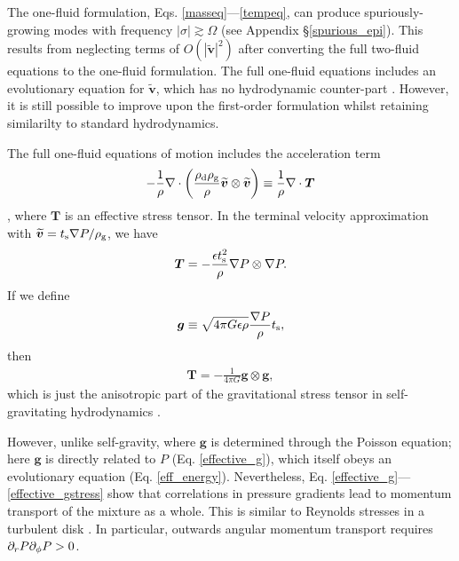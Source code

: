 The one-fluid formulation, 
Eqs. \ref{masseq}---\ref{tempeq}, can 
produce spuriously-growing modes with frequency $|\sigma|\gtrsim
\Omega$ (see Appendix \S\ref{spurious_epi}). This 
results from neglecting terms of $O(|\widetilde{\bm{v}}|^2)$ after converting
the full two-fluid equations to the one-fluid formulation. The full
one-fluid equations 
 includes an evolutionary equation for $\widetilde{\bm{v}}$, which has no
 hydrodynamic counter-part \citep{laibe14}. However, it is
 still possible to improve upon 
 the first-order formulation whilst retaining similarilty to  
 standard hydrodynamics.  

The full one-fluid equations of motion includes the acceleration term 
\begin{align}
-\frac{1}{\rho}\nabla\cdot\left(\frac{\rho_\mathrm{d}\rho_\mathrm{g}}{\rho}\widetilde{\bm{v}}\otimes\widetilde{\bm{v}}\right) 
\equiv  \frac{1}{\rho}\nabla\cdot \bm{T} 
\end{align}
\citep{youdin05a}, 
where $\bm{T}$ is an effective stress tensor. 
In the terminal velocity
approximation with $\widetilde{\bm{v}} = t_\mathrm{s} 
\nabla P/\rho_\mathrm{g}$, we have 
\begin{align}
\bm{T} = - \frac{\epsilon t_\mathrm{s}^2}{\rho}\nabla P \otimes \nabla P.
\end{align}
If we define 
\begin{align}
  \bm{g} \equiv \sqrt{4\pi G \epsilon \rho} \frac{\nabla P}{\rho}
  t_\mathrm{s},\label{effective_g} 
\end{align}
then
\begin{align}
\bm{T} = - \frac{1}{4\pi G} \bm{g}\otimes\bm{g}, \label{effective_gstress}
\end{align}
which is just the anisotropic part of the  
gravitational stress tensor in self-gravitating hydrodynamics 
\citep{lynden-bell72}.

 However, unlike self-gravity, where $\bm{g}$ is
determined through the Poisson equation; here $\bm{g}$ is directly
related to $P$ (Eq. \ref{effective_g}), which itself obeys an 
evolutionary equation (Eq. \ref{eff_energy}). 
Nevertheless, Eq. \ref{effective_g}---\ref{effective_gstress}
show that correlations in  pressure gradients lead to 
momentum transport of the mixture as a whole. This is similar to Reynolds stresses in
a turbulent disk \citep{balbus99}. In particular, 
outwards angular momentum transport requires $\partial_rP\partial_\phi P > 0$.    

